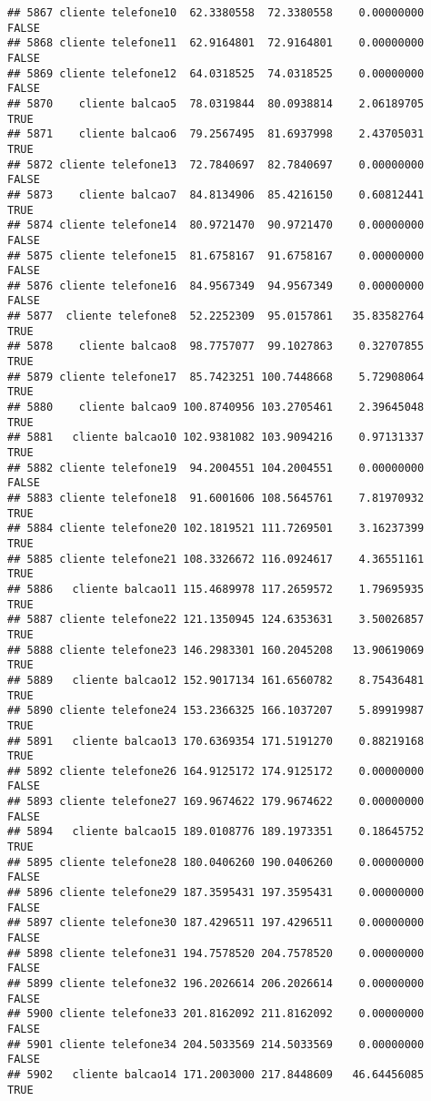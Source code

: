 \documentclass[
]{article}
\begin{document}
\begin{verbatim}
## 5867 cliente telefone10  62.3380558  72.3380558    0.00000000    FALSE
## 5868 cliente telefone11  62.9164801  72.9164801    0.00000000    FALSE
## 5869 cliente telefone12  64.0318525  74.0318525    0.00000000    FALSE
## 5870    cliente balcao5  78.0319844  80.0938814    2.06189705     TRUE
## 5871    cliente balcao6  79.2567495  81.6937998    2.43705031     TRUE
## 5872 cliente telefone13  72.7840697  82.7840697    0.00000000    FALSE
## 5873    cliente balcao7  84.8134906  85.4216150    0.60812441     TRUE
## 5874 cliente telefone14  80.9721470  90.9721470    0.00000000    FALSE
## 5875 cliente telefone15  81.6758167  91.6758167    0.00000000    FALSE
## 5876 cliente telefone16  84.9567349  94.9567349    0.00000000    FALSE
## 5877  cliente telefone8  52.2252309  95.0157861   35.83582764     TRUE
## 5878    cliente balcao8  98.7757077  99.1027863    0.32707855     TRUE
## 5879 cliente telefone17  85.7423251 100.7448668    5.72908064     TRUE
## 5880    cliente balcao9 100.8740956 103.2705461    2.39645048     TRUE
## 5881   cliente balcao10 102.9381082 103.9094216    0.97131337     TRUE
## 5882 cliente telefone19  94.2004551 104.2004551    0.00000000    FALSE
## 5883 cliente telefone18  91.6001606 108.5645761    7.81970932     TRUE
## 5884 cliente telefone20 102.1819521 111.7269501    3.16237399     TRUE
## 5885 cliente telefone21 108.3326672 116.0924617    4.36551161     TRUE
## 5886   cliente balcao11 115.4689978 117.2659572    1.79695935     TRUE
## 5887 cliente telefone22 121.1350945 124.6353631    3.50026857     TRUE
## 5888 cliente telefone23 146.2983301 160.2045208   13.90619069     TRUE
## 5889   cliente balcao12 152.9017134 161.6560782    8.75436481     TRUE
## 5890 cliente telefone24 153.2366325 166.1037207    5.89919987     TRUE
## 5891   cliente balcao13 170.6369354 171.5191270    0.88219168     TRUE
## 5892 cliente telefone26 164.9125172 174.9125172    0.00000000    FALSE
## 5893 cliente telefone27 169.9674622 179.9674622    0.00000000    FALSE
## 5894   cliente balcao15 189.0108776 189.1973351    0.18645752     TRUE
## 5895 cliente telefone28 180.0406260 190.0406260    0.00000000    FALSE
## 5896 cliente telefone29 187.3595431 197.3595431    0.00000000    FALSE
## 5897 cliente telefone30 187.4296511 197.4296511    0.00000000    FALSE
## 5898 cliente telefone31 194.7578520 204.7578520    0.00000000    FALSE
## 5899 cliente telefone32 196.2026614 206.2026614    0.00000000    FALSE
## 5900 cliente telefone33 201.8162092 211.8162092    0.00000000    FALSE
## 5901 cliente telefone34 204.5033569 214.5033569    0.00000000    FALSE
## 5902   cliente balcao14 171.2003000 217.8448609   46.64456085     TRUE

\end{verbatim}
\end{document}
